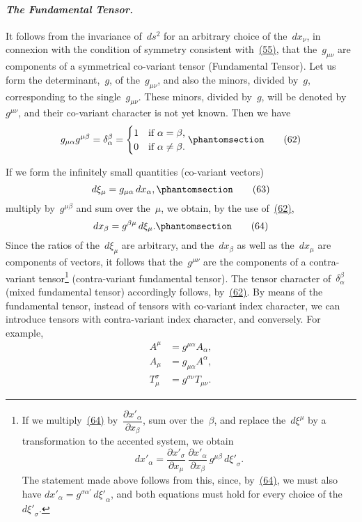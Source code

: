 \documentclass[12pt]{book}[2005/09/16]
\newcommand{\Paragraph}[1]{\paragraph*{\indent\normalfont\itshape#1}}
\newcommand{\Change}[2]{#2}
\newcommand{\Add}[1]{\Change{}{#1}}
\newcommand{\PageSep}[1]{\ignorespaces}
\newcommand{\Tag}[1]{%
  \phantomsection
  \label{eqn:#1}
  \tag*{#1}
}
\newcommand{\Eqref}[1]{\hyperref[eqn:#1]{#1}}
\newcommand{\dd}{\partial}
\begin{document}
\Paragraph{The Fundamental Tensor.} It follows from the invariance
%
%
of~$ds^{2}$ for an arbitrary choice of the~$dx_{\nu}$, in connexion
with the condition of symmetry consistent with~\Eqref{(55)}, that
the~$g_{\mu\nu}$ are components of a symmetrical co-variant tensor
(Fundamental Tensor). Let us form the determinant,~$g$,
of the~$g_{\mu\nu}$, and also the minors, divided by~$g$, corresponding
to the single~$g_{\mu\nu}$. These minors, divided by~$g$,
will be denoted by~$g^{\mu\nu}$, and their co-variant character
is not yet known. Then we have
\[
g_{\mu\alpha} g^{\mu\beta} = \delta_{\alpha}^{\beta}
  = \begin{cases}
    1 & \text{if $\alpha = \beta$\Add{,}} \\
    0 & \text{if $\alpha \neq \beta$\Add{.}}
  \end{cases}
\Tag{(62)}
\]

If we form the infinitely small quantities (co-variant
vectors)
\[
d\xi_{\mu} = g_{\mu\alpha}\, dx_{\alpha}\Add{,}
\Tag{(63)}
\]
\PageSep{75}
multiply by~$g^{\mu\beta}$ and sum over the~$\mu$, we obtain, by the
use of~\Eqref{(62)},
\[
dx_{\beta} = g^{\beta\mu}\, d\xi_{\mu}\Add{.}
\Tag{(64)}
\]
Since the ratios of the~$d\xi_{\mu}$ are arbitrary, and the~$dx_{\beta}$ as
well as the~$dx_{\mu}$ are components of vectors, it follows that
%
the~$g^{\mu\nu}$ are the components of a contra-variant tensor\footnote
  {If we multiply~\Eqref{(64)} by~$\dfrac{{\dd x'}_{\alpha}}{\dd x_{\beta}}$, sum over the~$\beta$, and replace the~$d\xi^{\mu}$ by a
  transformation to the accented system, we obtain
  \[
  {dx'}_{\alpha}
    = \frac{{\dd x'}_{\sigma}}{\dd x_{\mu}}\,
      \frac{{\dd x'}_{\alpha}}{\dd x_{\beta}}\, g^{\mu\beta}\, {d\xi'}_{\sigma}.
  \]
  The statement made above follows from this, since, by~\Eqref{(64)}, we must also
  have ${dx'}_{\alpha} = g^{\sigma\alpha'}\, {d\xi'}_{\alpha}$, and both equations must hold for every choice of the~${d\xi'}_{\sigma}$.}
(contra-variant fundamental tensor). The tensor character
of~$\delta_{\alpha}^{\beta}$ (mixed fundamental tensor) accordingly follows,
by~\Eqref{(62)}. By means of the fundamental tensor, instead
of tensors with co-variant index character, we can
introduce tensors with contra-variant index character,
and conversely. For example,
\begin{align*}
A^{\mu} &= g^{\mu\alpha} A_{\alpha}\Add{,} \\
A_{\mu} &= g_{\mu\alpha} A^{\alpha}\Add{,} \\
T_{\mu}^{\sigma} &= g^{\sigma\nu} T_{\mu\nu}.
\end{align*}
\end{document}
